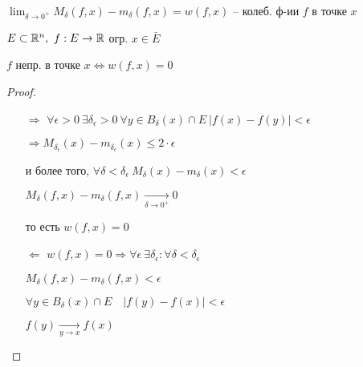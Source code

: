     \begin{definition}
        $\lim_{\delta \rightarrow 0^+} M_\delta(f, x) - m_\delta(f, x) = w(f, x)$ -- колеб. ф-ии $f$ в точке $x$
    \end{definition}

    \begin{lemma}
        $E \subset \mathbb{R}^n, \ f : E \rightarrow \mathbb{R}$ огр. \quad $x \in \bar E$
        \par $f$ непр. в точке $x \Leftrightarrow w(f, x) = 0$
    \end{lemma}
    \begin{proof}
        $ $


        \begin{enumerate}
            

            \item[$\boxed \Rightarrow$] $\forall \epsilon > 0 \ \exists \delta_\epsilon > 0 \ \forall y \in B_\delta(x) \cap E \ |f(x) - f(y)| < \epsilon$
                \par $\Rightarrow M_{\delta_\epsilon}(x) - m_{\delta_\epsilon}(x) \le 2\cdot\epsilon$
                \par и более того, $\forall \delta < \delta_\epsilon \ M_{\delta}(x) - m_{\delta}(x) < \epsilon$ \
                                \par $M_\delta(f, x) - m_\delta(f, x) \xrightarrow[\delta \rightarrow 0^+]{} 0$
                \par то есть $w(f, x) = 0$
            \item[$\boxed \Leftarrow$] $w(f, x) = 0 \Rightarrow \forall \epsilon \ \exists \delta_\epsilon : \forall \delta < \delta_\epsilon$
                \par $M_\delta(f, x) - m_\delta(f, x) < \epsilon$
                \par $\forall y \in B_\delta(x) \cap E \quad |f(y) - f(x)| < \epsilon$
                \par $f(y) \xrightarrow[y \rightarrow x]{} f(x)$
        \end{enumerate}


    \end{proof}

